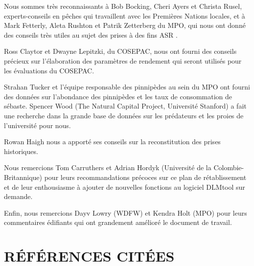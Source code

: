 \documentclass[french,11pt]{book}
\begin{document}
Nous sommes très reconnaissants à Bob Bocking, Cheri Ayers et Christa Rusel, experts-conseils en pêches qui travaillent avec les Premières Nations locales, et à Mark Fetterly, Aleta Rushton et Patrik Zetterberg du MPO, qui nous ont donné des conseils très utiles au sujet des prises à des fins ASR .

Ross Claytor et Dwayne Lepitzki, du COSEPAC, nous ont fourni des conseils précieux sur l'élaboration des paramètres de rendement qui seront utilisés pour les évaluations du COSEPAC.

Strahan Tucker et l'équipe responsable des pinnipèdes au sein du MPO ont fourni des données sur l'abondance des pinnipèdes et les taux de consommation de sébaste. Spencer Wood (The Natural Capital Project, Université Stanford) a fait une recherche dans la grande base de données sur les prédateurs et les proies de l'université pour nous.

Rowan Haigh nous a apporté ses conseils sur la reconstitution des prises historiques.

Nous remercions Tom Carruthers et Adrian Hordyk (Université de la Colombie-Britannique) pour leurs recommandations précoces sur ce plan de rétablissement et de leur enthousiasme à ajouter de nouvelles fonctions au logiciel DLMtool sur demande.

Enfin, nous remercions Dayv Lowry (WDFW) et Kendra Holt (MPO) pour leurs commentaires édifiants qui ont grandement amélioré le document de travail.

\clearpage

\hypertarget{ruxe9fuxe9rences-cituxe9es}{%
\section*{RÉFÉRENCES CITÉES}\label{ruxe9fuxe9rences-cituxe9es}}
\noindent
\vspace{-2em}
\setlength{\parindent}{-0.2in}
\setlength{\leftskip}{0.2in}
\setlength{\parskip}{8pt}
\end{document}
